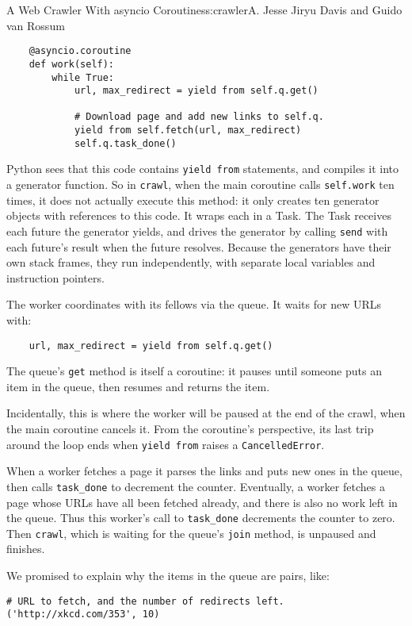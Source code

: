 \begin{aosachapter}{A Web Crawler With asyncio Coroutines}{s:crawler}{A. Jesse Jiryu Davis and Guido van Rossum}
\begin{verbatim}
    @asyncio.coroutine
    def work(self):
        while True:
            url, max_redirect = yield from self.q.get()

            # Download page and add new links to self.q.
            yield from self.fetch(url, max_redirect)
            self.q.task_done()
\end{verbatim}

Python sees that this code contains \texttt{yield from} statements, and
compiles it into a generator function. So in \texttt{crawl}, when the
main coroutine calls \texttt{self.work} ten times, it does not actually
execute this method: it only creates ten generator objects with
references to this code. It wraps each in a Task. The Task receives each
future the generator yields, and drives the generator by calling
\texttt{send} with each future's result when the future resolves.
Because the generators have their own stack frames, they run
independently, with separate local variables and instruction pointers.

The worker coordinates with its fellows via the queue. It waits for new
URLs with:

\begin{verbatim}
    url, max_redirect = yield from self.q.get()
\end{verbatim}

The queue's \texttt{get} method is itself a coroutine: it pauses until
someone puts an item in the queue, then resumes and returns the item.

Incidentally, this is where the worker will be paused at the end of the
crawl, when the main coroutine cancels it. From the coroutine's
perspective, its last trip around the loop ends when \texttt{yield from}
raises a \texttt{CancelledError}.

When a worker fetches a page it parses the links and puts new ones in
the queue, then calls \texttt{task\_done} to decrement the counter.
Eventually, a worker fetches a page whose URLs have all been fetched
already, and there is also no work left in the queue. Thus this worker's
call to \texttt{task\_done} decrements the counter to zero. Then
\texttt{crawl}, which is waiting for the queue's \texttt{join} method,
is unpaused and finishes.

We promised to explain why the items in the queue are pairs, like:

\begin{verbatim}
# URL to fetch, and the number of redirects left.
('http://xkcd.com/353', 10)
\end{verbatim}


\end{aosachapter}
